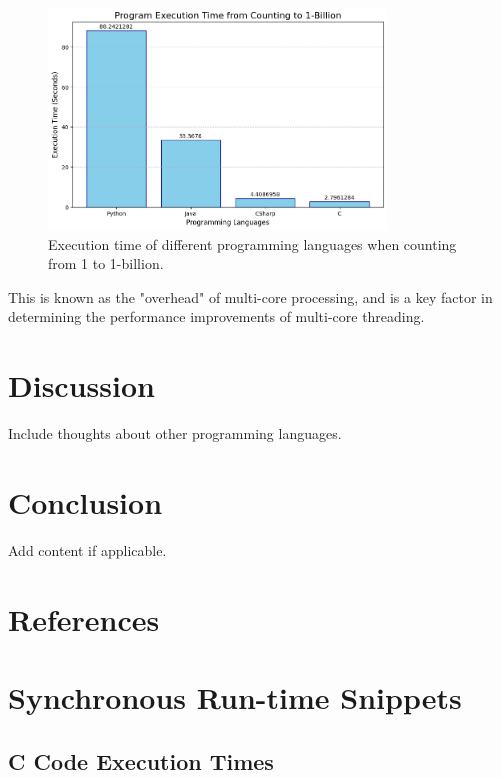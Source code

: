 \documentclass{article}
\begin{document}
\begin{figure}
    \centering
    \includegraphics[width=0.8\textwidth]{../records/sync_exec_times.png}
    \captionsetup{font=tiny, justification=centering}
    \caption{Execution time of different programming languages when counting from 1 to 1-billion.}
    \label{fig:sync-exec-times}
\end{figure}

This is known as the "overhead" of multi-core processing, and is a key factor in determining the performance improvements of multi-core threading.

\section{Discussion}

Include thoughts about other programming languages.

\section{Conclusion}

Add content if applicable.

\newpage
\section{References}
\printbibliography

\clearpage
\appendix

\section{Synchronous Run-time Snippets}

\subsection{C Code Execution Times} 
\end{document}

